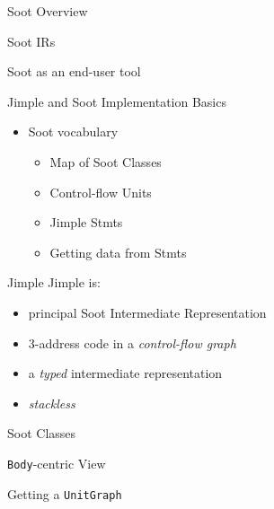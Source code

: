 \begin{slide}{Soot Overview}
\end{slide}

\begin{slide}{Soot IRs}
\end{slide}

\begin{slide}{Soot as an end-user tool}
\end{slide}

\begin{slide}{Jimple and Soot Implementation Basics}
\begin{itemize}
\item Soot vocabulary
\begin{itemize}
\item Map of Soot Classes
\item Control-flow Units
\item Jimple Stmts
\item Getting data from Stmts
\end{itemize}
\end{itemize}
\end{slide}

\begin{slide}{Jimple}
Jimple is:
\begin{itemize}
\item principal Soot Intermediate Representation
\item 3-address code in a \emph{control-flow graph}
\item a \emph{typed} intermediate representation
\item \emph{stackless}
\end{itemize}
\end{slide}

\begin{slide}{Soot Classes}
\vspace*{-0.1in}
\begin{center}

\end{center}
\end{slide}

\begin{slide}{{\tt Body}-centric View}
\begin{center}

\end{center}
\end{slide}

\begin{slide}{Getting a {\tt UnitGraph}}
\begin{center}

\end{center}
\end{slide}

